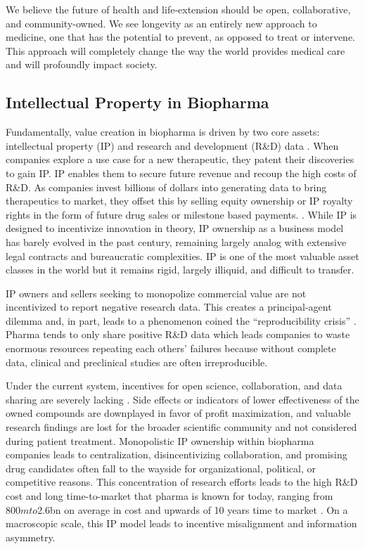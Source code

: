 \documentclass[12pt,letterpaper]{article}
\begin{document}
We believe the future of health and life-extension should be open, collaborative, and community-owned. We see longevity as an entirely new approach to medicine, one that has the potential to prevent, as opposed to treat or intervene. This approach will completely change the way the world provides medical care and will profoundly impact society.

\subsection{Intellectual Property in Biopharma}
Fundamentally, value creation in biopharma is driven by two core assets: intellectual property (IP) and research and development (R\&D) data \citep{Chandra2011}. When companies explore a use case for a new therapeutic, they patent their discoveries to gain IP. IP enables them to secure future revenue and recoup the high costs of R\&D. As companies invest billions of dollars into generating data to bring therapeutics to market, they offset this by selling equity ownership or IP royalty rights in the form of future drug sales or milestone based payments. \citep{Wouters2020}. While IP is designed to incentivize innovation in theory, IP ownership as a business model has barely evolved in the past century, remaining largely analog with extensive legal contracts and bureaucratic complexities. IP is one of the most valuable asset classes in the world but it remains rigid, largely illiquid, and difficult to transfer.

IP owners and sellers seeking to monopolize commercial value are not incentivized to report negative research data. This creates a principal-agent dilemma and, in part, leads to a phenomenon coined the “reproducibility crisis” \citep{Sherkow2017}. Pharma tends to only share positive R\&D data which leads companies to waste enormous resources repeating each others’ failures because without complete data, clinical and preclinical studies are often irreproducible. 

Under the current system, incentives for open science, collaboration, and data sharing are severely lacking \citep{Ali-Khan2017}. Side effects or indicators of lower effectiveness of the owned compounds are downplayed in favor of profit maximization, and valuable research findings are lost for the broader scientific community and not considered during patient treatment. Monopolistic IP ownership within biopharma companies leads to centralization, disincentivizing collaboration, and promising drug candidates often fall to the wayside for organizational, political, or competitive reasons. This concentration of research efforts leads to the high R\&D cost and long time-to-market that pharma is known for today, ranging from $800m to $2.6bn on average in cost and upwards of 10 years time to market \citep{DiMasi2016}. On a macroscopic scale, this IP model leads to incentive misalignment and information asymmetry. 
\end{document}
